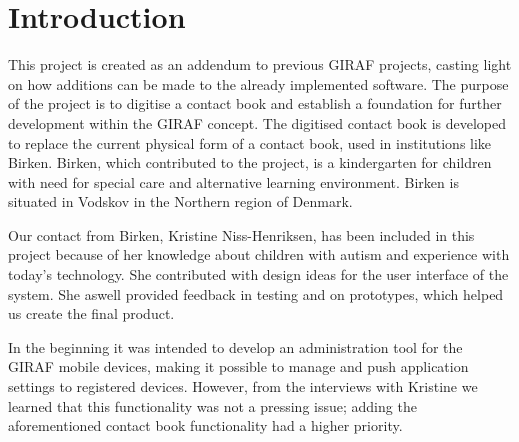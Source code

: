\chapter{Introduction}


This project is created as an addendum to previous GIRAF projects, casting light on how additions can be made to the already implemented software.
The purpose of the project is to digitise a contact book and establish a foundation for further development within the GIRAF concept.
The digitised contact book is developed to replace the current physical form of a contact book, used in institutions like Birken.
Birken, which contributed to the project, is a kindergarten for children with need for special care and alternative learning environment. Birken is situated in Vodskov in the Northern region of Denmark.

Our contact from Birken, Kristine Niss-Henriksen, has been included in this project because of her knowledge about children with autism and experience with today's technology. She contributed with design ideas for the user interface of the system. She aswell provided feedback in testing and on prototypes, which helped us create the final product.

In the beginning it was intended to develop an administration tool for the GIRAF mobile devices, making it possible to manage and push application settings to registered devices. However, from the interviews with Kristine we learned that this functionality was not a pressing issue; adding the aforementioned contact book functionality had a higher priority.  

